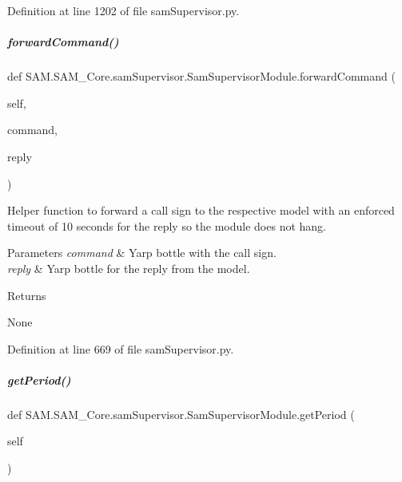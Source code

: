 Definition at line 1202 of file sam\+Supervisor.\+py.

\mbox{\label{group__icubclient__SAM__Core_a6722f96c337b111bb5ac88995577cf66}} 
\subparagraph{\texorpdfstring{forward\+Command()}{forwardCommand()}}
{\footnotesize\ttfamily def S\+A\+M.\+S\+A\+M\+\_\+\+Core.\+sam\+Supervisor.\+Sam\+Supervisor\+Module.\+forward\+Command (\begin{DoxyParamCaption}\item[{}]{self,  }\item[{}]{command,  }\item[{}]{reply }\end{DoxyParamCaption})}



Helper function to forward a call sign to the respective model with an enforced timeout of 10 seconds for the reply so the module does not hang. 


\begin{DoxyParams}{Parameters}
{\em command} & Yarp bottle with the call sign. \\
\hline
{\em reply} & Yarp bottle for the reply from the model.\\
\hline
\end{DoxyParams}
\begin{DoxyReturn}{Returns}


None 
\end{DoxyReturn}


Definition at line 669 of file sam\+Supervisor.\+py.

\mbox{\label{group__icubclient__SAM__Core_a359693de09f891957293074941a5a254}} 
\subparagraph{\texorpdfstring{get\+Period()}{getPeriod()}}
{\footnotesize\ttfamily def S\+A\+M.\+S\+A\+M\+\_\+\+Core.\+sam\+Supervisor.\+Sam\+Supervisor\+Module.\+get\+Period (\begin{DoxyParamCaption}\item[{}]{self }\end{DoxyParamCaption})}



